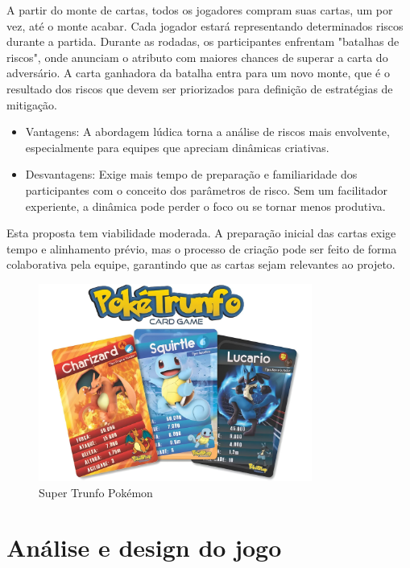 \documentclass[
	12pt,
	openright,
	twoside,
	a4paper,
	english,
	brazil
	]{abntex2}
\begin{document}
A partir do monte de cartas, todos os jogadores compram suas cartas, um por vez, até o monte acabar. Cada jogador estará representando determinados riscos durante a partida. Durante as rodadas, os participantes enfrentam "batalhas de riscos", onde anunciam o atributo com maiores chances de superar a carta do adversário. A carta ganhadora da batalha entra para um novo monte, que é o resultado dos riscos que devem ser priorizados para definição de estratégias de mitigação.

\begin{itemize}
  \item Vantagens: A abordagem lúdica torna a análise de riscos mais envolvente, especialmente para equipes que apreciam dinâmicas criativas.
  \item Desvantagens: Exige mais tempo de preparação e familiaridade dos participantes com o conceito dos parâmetros de risco. Sem um facilitador experiente, a dinâmica pode perder o foco ou se tornar menos produtiva.
\end{itemize}

Esta proposta tem viabilidade moderada. A preparação inicial das cartas exige tempo e alinhamento prévio, mas o processo de criação pode ser feito de forma colaborativa pela equipe, garantindo que as cartas sejam relevantes ao projeto.

\begin{figure}[H]
  \centering
	\caption{\label{super-trunfo}Super Trunfo Pokémon}
  \includegraphics[width=0.8\textwidth]{super-trunfo}
\end{figure}


\section{Análise e design do jogo}
\end{document}

